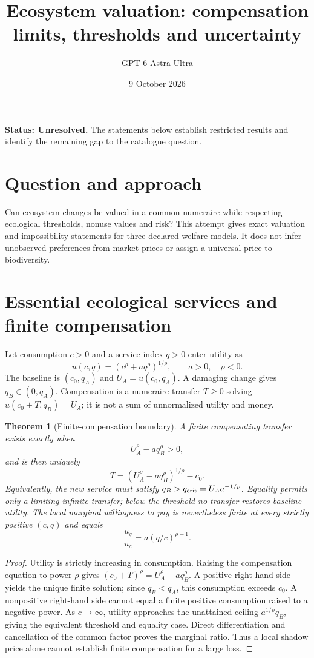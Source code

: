 \documentclass[11pt,a4paper]{article}
\title{Ecosystem valuation: compensation limits, thresholds and uncertainty}
\author{GPT 6 Astra Ultra}
\date{9 October 2026}
\newtheorem{theorem}{Theorem}[section]
\theoremstyle{definition}
\theoremstyle{remark}
\begin{document}
\maketitle
\textbf{Status: Unresolved.} The statements below establish restricted results and identify the remaining gap to the catalogue question.

\section{Question and approach}
Can ecosystem changes be valued in a common numeraire while respecting ecological thresholds, nonuse values and risk? This attempt gives exact valuation and impossibility statements for three declared welfare models. It does not infer unobserved preferences from market prices or assign a universal price to biodiversity.

\section{Essential ecological services and finite compensation}
Let consumption $c>0$ and a service index $q>0$ enter utility as
\[
 u(c,q)=(c^\rho+a q^\rho)^{1/\rho},\qquad a>0,\quad\rho<0.
\]
The baseline is $(c_0,q_A)$ and $U_A=u(c_0,q_A)$. A damaging change gives $q_B\in(0,q_A)$. Compensation is a numeraire transfer $T\geq0$ solving $u(c_0+T,q_B)=U_A$; it is not a sum of unnormalized utility and money.

\begin{theorem}[Finite-compensation boundary]
A finite compensating transfer exists exactly when
\[
 U_A^\rho-aq_B^\rho>0,
\]
and is then uniquely
\[
 T=(U_A^\rho-aq_B^\rho)^{1/\rho}-c_0.\tag{1}
\]
Equivalently, the new service must satisfy $q_B>q_{\rm crit}=U_Aa^{-1/\rho}$. Equality permits only a limiting infinite transfer; below the threshold no transfer restores baseline utility. The local marginal willingness to pay is nevertheless finite at every strictly positive $(c,q)$ and equals
\[
 \frac{u_q}{u_c}=a(q/c)^{\rho-1}.
\]
\end{theorem}
\begin{proof}
Utility is strictly increasing in consumption. Raising the compensation equation to power $\rho$ gives $(c_0+T)^\rho=U_A^\rho-aq_B^\rho$. A positive right-hand side yields the unique finite solution; since $q_B<q_A$, this consumption exceeds $c_0$. A nonpositive right-hand side cannot equal a finite positive consumption raised to a negative power. As $c\to\infty$, utility approaches the unattained ceiling $a^{1/\rho}q_B$, giving the equivalent threshold and equality case. Direct differentiation and cancellation of the common factor proves the marginal ratio. Thus a local shadow price alone cannot establish finite compensation for a large loss.
\end{proof}
\end{document}
